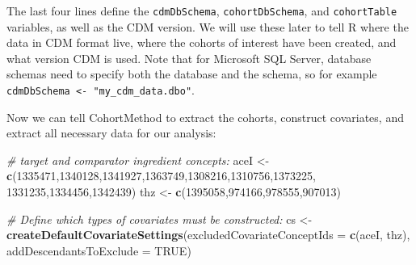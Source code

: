 \documentclass[11pt]{book}
\newenvironment{Shaded}{\begin{snugshade}}{\end{snugshade}}
\newcommand{\CommentTok}[1]{\textcolor[rgb]{0.56,0.35,0.01}{\textit{#1}}}
\newcommand{\DataTypeTok}[1]{\textcolor[rgb]{0.13,0.29,0.53}{#1}}
\newcommand{\DecValTok}[1]{\textcolor[rgb]{0.00,0.00,0.81}{#1}}
\newcommand{\KeywordTok}[1]{\textcolor[rgb]{0.13,0.29,0.53}{\textbf{#1}}}
\newcommand{\NormalTok}[1]{#1}
\newcommand{\OtherTok}[1]{\textcolor[rgb]{0.56,0.35,0.01}{#1}}
\newcommand{\StringTok}[1]{\textcolor[rgb]{0.31,0.60,0.02}{#1}}
\theoremstyle{definition}
\theoremstyle{definition}
\theoremstyle{definition}
\theoremstyle{remark}
\begin{document}
The last four lines define the \texttt{cdmDbSchema}, \texttt{cohortDbSchema}, and \texttt{cohortTable} variables, as well as the CDM version. We will use these later to tell R where the data in CDM format live, where the cohorts of interest have been created, and what version CDM is used. Note that for Microsoft SQL Server, database schemas need to specify both the database and the schema, so for example \texttt{cdmDbSchema\ \textless{}-\ "my\_cdm\_data.dbo"}.

Now we can tell CohortMethod to extract the cohorts, construct covariates, and extract all necessary data for our analysis:

\begin{Shaded}
\begin{Highlighting}[]
\CommentTok{# target and comparator ingredient concepts:}
\NormalTok{aceI <-}\StringTok{ }\KeywordTok{c}\NormalTok{(}\DecValTok{1335471}\NormalTok{,}\DecValTok{1340128}\NormalTok{,}\DecValTok{1341927}\NormalTok{,}\DecValTok{1363749}\NormalTok{,}\DecValTok{1308216}\NormalTok{,}\DecValTok{1310756}\NormalTok{,}\DecValTok{1373225}\NormalTok{,}
          \DecValTok{1331235}\NormalTok{,}\DecValTok{1334456}\NormalTok{,}\DecValTok{1342439}\NormalTok{)}
\NormalTok{thz <-}\StringTok{ }\KeywordTok{c}\NormalTok{(}\DecValTok{1395058}\NormalTok{,}\DecValTok{974166}\NormalTok{,}\DecValTok{978555}\NormalTok{,}\DecValTok{907013}\NormalTok{)}

\CommentTok{# Define which types of covariates must be constructed:}
\NormalTok{cs <-}\StringTok{ }\KeywordTok{createDefaultCovariateSettings}\NormalTok{(}\DataTypeTok{excludedCovariateConceptIds =} \KeywordTok{c}\NormalTok{(aceI,}
\NormalTok{                                                                     thz),}
                                     \DataTypeTok{addDescendantsToExclude =} \OtherTok{TRUE}\NormalTok{)}


\end{Highlighting}
\end{Shaded}
\end{document}
